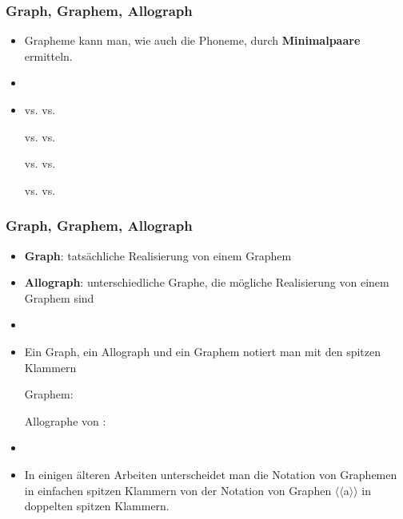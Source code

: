 \begin{frame}
\frametitle{Graph, Graphem, Allograph}

	\begin{itemize}
		\item Grapheme kann man, wie auch die Phoneme, durch \textbf{Minimalpaare} ermitteln.
		
\pause
		\item[]
		\item[]

		  \ea
                   vs.  \ras {} vs. 
                  \z

		
		  \ea
                   vs.  \ras {} vs. 
                  \z

		
		  \ea
                   vs.  \ras {} vs. 
                  \z


		  \ea
                   vs.  \ras {} vs. 
                  \z


\end{itemize}


\end{frame}


\begin{frame}
\frametitle{Graph, Graphem, Allograph}

	\begin{itemize}
		\item \textbf{Graph}: tatsächliche Realisierung von einem Graphem
		\item \textbf{Allograph}: unterschiedliche Graphe, die mögliche Realisierung von einem Graphem sind
		\item[]
		\item Ein Graph, ein Allograph und ein Graphem notiert man mit den spitzen Klammern \ab{}
	
			Graphem: 

			Allographe von :     %

		\item[]
		\item In einigen älteren Arbeiten unterscheidet man die Notation von Graphemen  in einfachen spitzen Klammern von der Notation von Graphen $\langle \langle$a$\rangle \rangle$ in doppelten spitzen Klammern.
	\end{itemize}


\end{frame}


